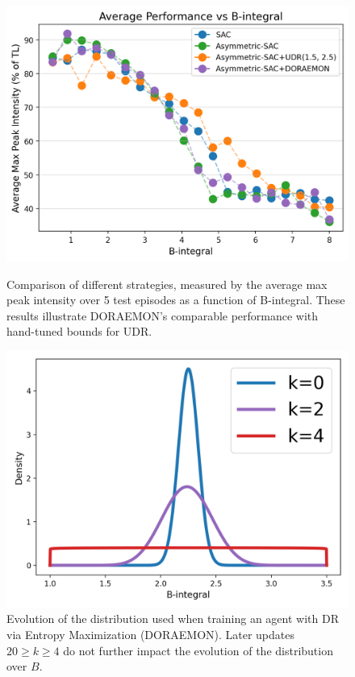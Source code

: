 \begin{figure}
    \centering
    \begin{minipage}{0.48\linewidth}
        \centering
        \includegraphics[width=\linewidth]{images/max_intensity_vs_b_integral.png}
        \caption{Comparison of different strategies, measured by the average max peak intensity over 5 test episodes as a function of B-integral. These results illustrate DORAEMON's comparable performance with hand-tuned bounds for UDR.}
        \label{fig:max_intensity_vs_b_integral}
    \end{minipage}
    \hfill
    \begin{minipage}{0.48\linewidth}
        \centering
        \includegraphics[width=\linewidth]{images/doraemon_distributions_3in1.png}
        \caption{Evolution of the distribution used when training an agent with DR via Entropy Maximization (DORAEMON). Later updates $20 \geq k \geq 4$ do not further impact the evolution of the distribution over $B$.
        }
        \label{fig:DORAEMON_distrs_over_training}
    \end{minipage}
\end{figure}

